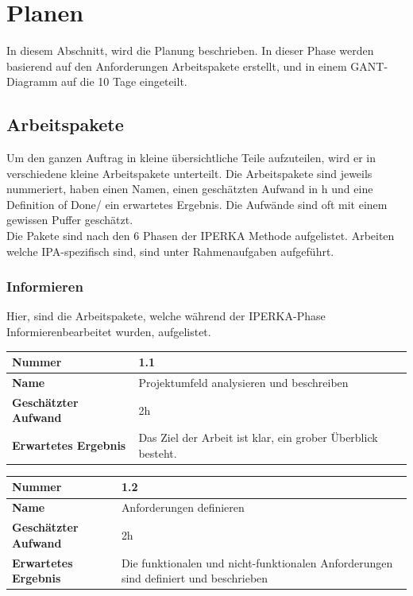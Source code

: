 \chapter{Planen}\label{ch:planen}
In diesem Abschnitt, wird die Planung beschrieben. In dieser Phase werden basierend auf den Anforderungen Arbeitspakete erstellt, und in einem GANT-Diagramm auf die 10 Tage eingeteilt.

\section{Arbeitspakete}

Um den ganzen Auftrag in kleine übersichtliche Teile aufzuteilen, wird er in verschiedene kleine Arbeitspakete unterteilt. Die Arbeitspakete sind jeweils nummeriert, haben einen Namen, einen geschätzten Aufwand in h und eine \flqq Definition of Done\frqq{}/ ein erwartetes Ergebnis. Die Aufwände sind oft mit einem gewissen Puffer geschätzt.\\
Die Pakete  sind nach den 6 Phasen der IPERKA Methode aufgelistet. Arbeiten welche IPA-spezifisch sind, sind unter Rahmenaufgaben aufgeführt.

\subsection{Informieren}
Hier, sind die Arbeitspakete, welche während der IPERKA-Phase \flqq Informieren\frqq{}\space bearbeitet wurden, aufgelistet.

\begin{longtable}{p{}|p{}}
	\hline
	\textbf{Nummer}    				& 1.1 \\
	\hline
	\textbf{Name}   				& Projektumfeld analysieren und beschreiben \\
	\hline
	\textbf{Geschätzter Aufwand}	& 2h \\
	\hline
	\textbf{Erwartetes Ergebnis}	& Das Ziel der Arbeit ist klar, ein grober Überblick besteht. \\
	\hline
\end{longtable}

\begin{longtable}{p{}|p{}}
	\hline
	\textbf{Nummer}    				& 1.2 \\
	\hline
	\textbf{Name}   				& Anforderungen definieren \\
	\hline
	\textbf{Geschätzter Aufwand}	& 2h \\
	\hline
	\textbf{Erwartetes Ergebnis}	& Die funktionalen und nicht-funktionalen Anforderungen sind definiert und beschrieben\\
	\hline
\end{longtable}\pagebreak


